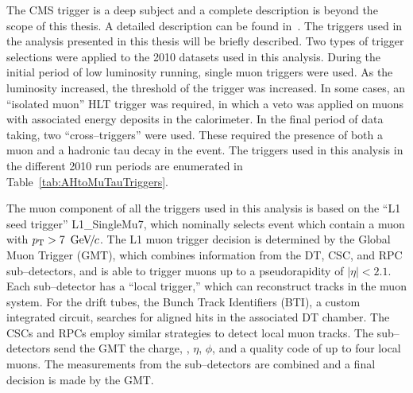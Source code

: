 The CMS trigger is a deep subject and a complete description is beyond the scope
of this thesis.  A detailed description can be found in~\cite{CMS-PTDRI}. The
triggers used in the analysis presented in this thesis will be briefly
described.  Two types of trigger selections were applied to the 2010 datasets
used in this analysis.  During the initial period of low luminosity running,
single muon triggers were used.  As the luminosity increased, the \pt threshold
of the trigger was increased.  In some cases, an ``isolated muon'' HLT trigger
was required, in which a veto was applied on muons with associated energy
deposits in the calorimeter.  In the final period of data taking, two
``cross--triggers'' were used.  These required the presence of both a muon and a
hadronic tau decay in the event.  The triggers used in this analysis in the
different 2010 run periods are enumerated in Table~\ref{tab:AHtoMuTauTriggers}.

The muon component of all the triggers used in this analysis is based on the
``L1 seed trigger'' L1\_SingleMu7, which nominally selects event which contain a
muon with $p_{\mathrm{T}} > 7~{\,\text{Ge\hspace{-.08em}V\hspace{-0.16em}/\hspace{-0.08em}}c}$.  The L1 muon trigger decision is determined by the
Global Muon Trigger (GMT), which combines information from the DT, CSC, and RPC
sub--detectors, and is able to trigger muons up to a pseudorapidity of $|\eta| <
2.1$.  Each sub--detector has a ``local trigger,'' which can reconstruct tracks
in the muon  system.  For the drift tubes, the Bunch Track Identifiers (BTI), a
custom integrated circuit, searches for aligned hits in the associated DT
chamber.  The CSCs and RPCs employ similar strategies to detect local muon
tracks.  The sub--detectors send the GMT the charge, \pt, $\eta$, $\phi$, and a
quality code of up to four local muons.  The measurements from the
sub--detectors are combined and a final decision is made by the GMT.
%
\ifx\master\undefined\fi

